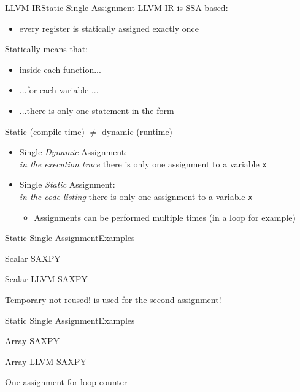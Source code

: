\begin{frame}{LLVM-IR}{Static Single Assignment}
LLVM-IR is SSA-based:

\begin{itemize}
\item every register is \alert{statically assigned} exactly \alert{once}
\end{itemize}
\bigskip
Statically means that:

\begin{itemize}
\item inside each function...
\item ...for each variable ...
\item ...there is \alert{only one} statement in the form 
\end{itemize}
\bigskip
\alert{Static} (compile time) $\neq$ \alert{dynamic} (runtime)
{\footnotesize
\begin{itemize}
\item Single \emph{Dynamic} Assignment:\\\emph{in the execution trace} there is only one assignment to a variable \texttt{x}
\item Single \emph{Static} Assignment:\\\emph{in the code listing} there is only one assignment to a variable \texttt{x}
\begin{itemize}
\scriptsize
\item Assignments \alert{can} be performed multiple times (in a loop for example)
\end{itemize}
\end{itemize}
}
\end{frame}


\begin{frame}{Static Single Assignment}{Examples}
\begin{block}{Scalar SAXPY}
\end{block}

\begin{block}{Scalar LLVM SAXPY}
\end{block}

Temporary  not reused!  is used for the second
assignment!
\end{frame}


\begin{frame}{Static Single Assignment}{Examples}
\begin{block}{Array SAXPY}
\end{block}

\begin{block}{Array LLVM SAXPY}
\end{block}

One assignment for loop counter 
\end{frame}

